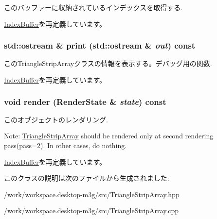 このバッファーに収納されているインデックスを取得する. 

\hyperlink{classm3g_1_1IndexBuffer_650953afac45099025a524ab160b911f}{IndexBuffer}を再定義しています。\hypertarget{classm3g_1_1TriangleStripArray_6fea17fa1532df3794f8cb39cb4f911f}{
\subsubsection[{print}]{\setlength{\rightskip}{0pt plus 5cm}std::ostream \& print (std::ostream \& {\em out}) const}}
\label{classm3g_1_1TriangleStripArray_6fea17fa1532df3794f8cb39cb4f911f}


このTriangleStripArrayクラスの情報を表示する。デバッグ用の関数. 

\hyperlink{classm3g_1_1IndexBuffer_6fea17fa1532df3794f8cb39cb4f911f}{IndexBuffer}を再定義しています。\hypertarget{classm3g_1_1TriangleStripArray_8babc8a79b78615da51161e94029eea9}{
\subsubsection[{render}]{\setlength{\rightskip}{0pt plus 5cm}void render ({\bf RenderState} \& {\em state}) const}}
\label{classm3g_1_1TriangleStripArray_8babc8a79b78615da51161e94029eea9}


このオブジェクトのレンダリング.

Note: \hyperlink{classm3g_1_1TriangleStripArray}{TriangleStripArray} should be rendered only at second rendering pass(pass=2). In other cases, do nothing. 

\hyperlink{classm3g_1_1IndexBuffer_8babc8a79b78615da51161e94029eea9}{IndexBuffer}を再定義しています。

このクラスの説明は次のファイルから生成されました:\begin{CompactItemize}
\item 
/work/workspace.desktop-m3g/src/TriangleStripArray.hpp\item 
/work/workspace.desktop-m3g/src/TriangleStripArray.cpp\end{CompactItemize}
